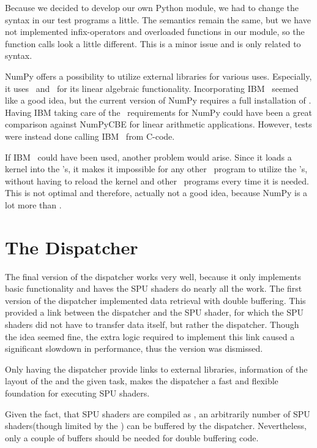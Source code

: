 Because we decided to develop our own Python module, we had to change
the syntax in our test programs a little. The semantics remain the
same, but we have not implemented infix-operators and overloaded
functions in our module, so the function calls look a little
different. This is a minor issue and is only related to syntax.

NumPy offers a possibility to utilize external libraries for various
uses. Especially, it uses \BLAS\ and \LAPACK\ for its linear algebraic
functionality. Incorporating IBM \BLAS\ seemed like a good idea, but
the current version of NumPy requires a full installation of
\ATLAS{}. Having IBM taking care of the \BLAS\ requirements for NumPy
could have been a great comparison against NumPyCBE for linear
arithmetic applications. However, tests were instead done calling IBM \BLAS\
from C-code.

If IBM \BLAS\ could have been used, another problem would arise. Since
it loads a kernel into the \SPE{}'s, it makes it impossible for any
other \CBE\ program to utilize the \SPE{}'s, without having to
reload the kernel and other \SPU\ programs every time it is
needed. This is not optimal and therefore, actually not a good idea,
because NumPy is a lot more than \BLAS{}.

\section{The Dispatcher}

The final version of the dispatcher works very well, because it only
implements basic functionality and haves the SPU shaders do nearly all
the work. The first version of the dispatcher implemented data
retrieval with double buffering. This provided a link between the
dispatcher and the SPU shader, for which the SPU shaders did not have
to transfer data itself, but rather the dispatcher. Though the idea
seemed fine, the extra logic required to implement this link caused a
significant slowdown in performance, thus the version was dismissed.

Only having the dispatcher provide links to external libraries,
information of the layout of the \LS{} and the given task, makes the
dispatcher a fast and flexible foundation for executing SPU shaders.

Given the fact, that SPU shaders are compiled as \PIC{}, an
arbitrarily number of SPU shaders(though limited by the \LS{}) can be
buffered by the dispatcher. Nevertheless, only a couple of buffers
should be needed for double buffering code.

